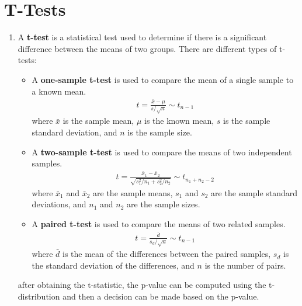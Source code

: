 \documentclass[letterpaper, 11pt]{article}
\newcommand{\1}{\mathds{1}}	%
\theoremstyle{definition}
\begin{document}
\section{T-Tests}
\begin{enumerate}
    \item A \textbf{t-test} is a statistical test used to determine if there is a significant difference between the means of two groups. There are different types of t-tests:
    \begin{itemize}
        \item A \textbf{one-sample t-test} is used to compare the mean of a single sample to a known mean.
        \begin{align}
            t = \frac{\bar{x} - \mu}{s / \sqrt{n}} \sim t_{n-1}
        \end{align}
        where $\bar{x}$ is the sample mean, $\mu$ is the known mean, $s$ is the sample standard deviation, and $n$ is the sample size.
        \item A \textbf{two-sample t-test} is used to compare the means of two independent samples.
        \begin{align}
            t = \frac{\bar{x}_1 - \bar{x}_2}{\sqrt{s_1^2 / n_1 + s_2^2 / n_2}} \sim t_{n_1 + n_2 - 2}
        \end{align}
        where $\bar{x}_1$ and $\bar{x}_2$ are the sample means, $s_1$ and $s_2$ are the sample standard deviations, and $n_1$ and $n_2$ are the sample sizes.
        \item A \textbf{paired t-test} is used to compare the means of two related samples.
        \begin{align}
            t = \frac{\bar{d}}{s_d / \sqrt{n}} \sim t_{n-1}
        \end{align}
        where $\bar{d}$ is the mean of the differences between the paired samples, $s_d$ is the standard deviation of the differences, and $n$ is the number of pairs.
    \end{itemize}
    after obtaining the t-statistic, the p-value can be computed using the t-distribution and then 
    a decision can be made based on the p-value.
\end{enumerate}
\end{document}
